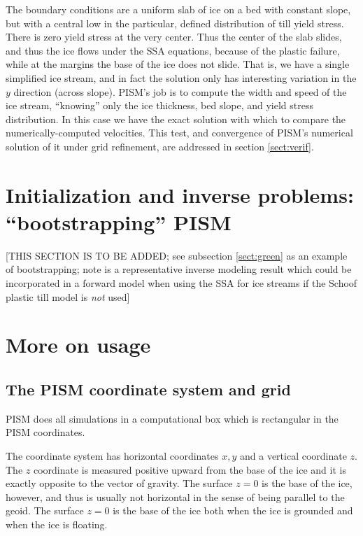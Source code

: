 \documentclass[11pt,final]{amsart}
\begin{document}
\noindent The boundary conditions are a uniform slab of ice on a bed with constant slope, but with a central low in the particular, defined distribution of till yield stress.  There is zero yield stress at the very center.  Thus the center of the slab slides, and thus the ice flows under the SSA equations, because of the plastic failure, while at the margins the base of the ice does not slide.  That is, we have a single simplified ice stream, and in fact the solution only has interesting variation in the $y$ direction (across slope).  PISM's job is to compute the width and speed of the ice stream, ``knowing'' only the ice thickness, bed slope, and yield stress distribution.  In this case we have the exact solution with which to compare the numerically-computed velocities.  This test, and convergence of PISM's numerical solution of it under grid refinement, are addressed in section \ref{sect:verif}.





\section{Initialization and inverse problems: ``bootstrapping'' PISM}\label{sect:boot}  [THIS SECTION IS TO BE ADDED; see subsection \ref{sect:green} as an example of bootstrapping;  note \cite{JoughinMacAyealTulaczyk} is a representative inverse modeling result which could be incorporated in a forward model when using the SSA for ice streams if the Schoof plastic till model is \emph{not} used]


\clearpage
\newpage
\section{More on usage}\label{sect:usage}

\subsection{The PISM coordinate system and grid} \label{subsect:coords} PISM does all simulations in a computational box which is rectangular in the PISM coordinates.

The coordinate system has horizontal coordinates $x,y$ and a vertical coordinate $z$.  The $z$ coordinate is measured positive upward from the base of the ice and it is exactly opposite to the vector of gravity.  The surface $z=0$ is the base of the ice, however, and thus is usually not horizontal in the sense of being parallel to the geoid.   The surface $z=0$ is the base of the ice both when the ice is grounded and when the ice is floating.
\end{document}
